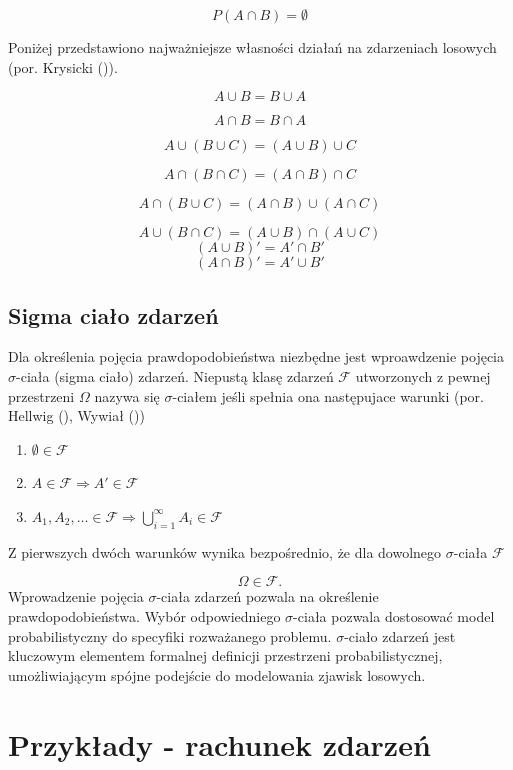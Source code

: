 \documentclass[
  letterpaper,
  DIV=11,
  numbers=noendperiod]{scrreprt}
\begin{document}
\[ P(A \cap B) = \emptyset\]

Poniżej przedstawiono najważniejsze własności działań na zdarzeniach
losowych (por. Krysicki ()).

\[ A \cup B = B \cup A \]

\[ A \cap B = B \cap A \]

\[ A \cup (B \cup C) = (A \cup B) \cup C \]

\[ A \cap (B \cap C) = (A \cap B) \cap C \]

\[ A \cap (B \cup C) = (A \cap B) \cup (A \cap C) \]

\[ A \cup (B \cap C) = (A \cup B) \cap (A \cup C) \]
\[(A \cup B)' = A' \cap B'\] \[(A \cap B)' = A' \cup B'\]

\subsection{Sigma ciało zdarzeń}\label{sigma-ciaux142o-zdarzeux144}

Dla określenia pojęcia prawdopodobieństwa niezbędne jest wproawdzenie
pojęcia \(\sigma\)-ciała (sigma ciało) zdarzeń. Niepustą klasę zdarzeń
\(\mathcal{F}\) utworzonych z pewnej przestrzeni \(\Omega\) nazywa się
\(\sigma\)-ciałem jeśli spełnia ona następujace warunki (por. Hellwig
(), Wywiał
())

\begin{enumerate}
\def\labelenumi{\arabic{enumi}.}
\item
  \(\emptyset \in \mathcal{F}\)
\item
  \(A \in \mathcal{F} \Rightarrow A' \in \mathcal{F}\)
\item
  \(A_1, A_2, \ldots \in \mathcal{F} \Rightarrow \bigcup_{i=1}^{\infty} A_i \in \mathcal{F}\)
\end{enumerate}

Z pierwszych dwóch warunków wynika bezpośrednio, że dla dowolnego
\(\sigma\)-ciała \(\mathcal{F}\)

\[ \Omega \in \mathcal{F}.\] Wprowadzenie pojęcia \(\sigma\)-ciała
zdarzeń pozwala na określenie prawdopodobieństwa. Wybór odpowiedniego
\(\sigma\)-ciała pozwala dostosować model probabilistyczny do specyfiki
rozważanego problemu. \(\sigma\)-ciało zdarzeń jest kluczowym elementem
formalnej definicji przestrzeni probabilistycznej, umożliwiającym spójne
podejście do modelowania zjawisk losowych.

\section{Przykłady - rachunek
zdarzeń}\label{przykux142ady---rachunek-zdarzeux144}
\end{document}
